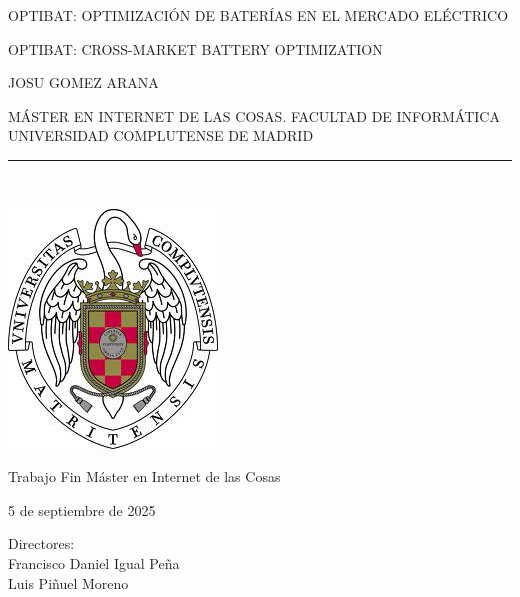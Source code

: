 \newpage

\thispagestyle{empty}

\begin{center}

  \vspace{1cm}

  {\large OPTIBAT\@: OPTIMIZACIÓN DE BATERÍAS EN EL MERCADO ELÉCTRICO}\\

  \vspace{0.5cm}

  {\large OPTIBAT\@: CROSS-MARKET BATTERY OPTIMIZATION}\\

  \vspace{0.5cm}

  \vspace{0.5cm}

  {\large JOSU GOMEZ ARANA}\\

  \vspace{0.5cm}

  MÁSTER EN INTERNET DE LAS COSAS\@. FACULTAD DE INFORMÁTICA\\
  UNIVERSIDAD COMPLUTENSE DE MADRID\\

  \vspace{0.65cm}

  \rule{2in}{0.5pt}\\

  \vspace{0.85cm}

  \includegraphics[height=2.5in]{figures/escudo.jpg}

  \vspace{0.5cm}

  Trabajo Fin Máster en Internet de las Cosas

  \vspace{0.5cm}

  5 de septiembre de 2025\\

  \vspace{1cm}

\end{center}

{
  \raggedleft
  Directores:\\
  \vspace{1cm}
  Francisco Daniel Igual Peña\\
  Luis Piñuel Moreno\\
}
